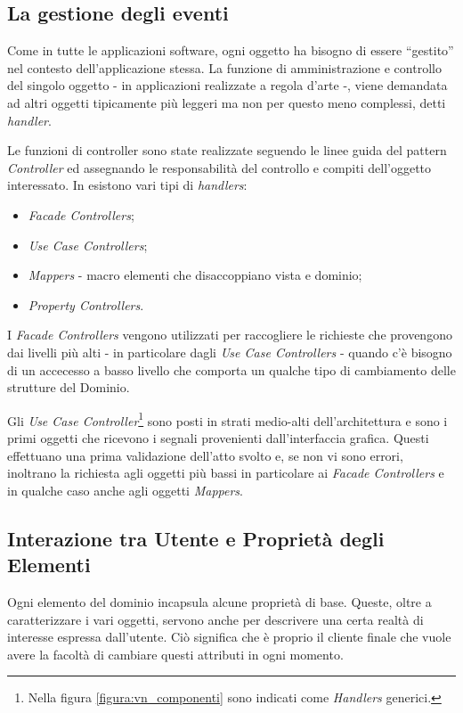 \subsection{La gestione degli eventi}
Come in tutte le applicazioni software, ogni oggetto ha bisogno di essere ``gestito'' nel contesto dell'applicazione stessa.
La funzione di amministrazione e controllo del singolo oggetto - in applicazioni realizzate a regola d'arte -, viene demandata ad altri oggetti tipicamente più leggeri ma non per questo meno complessi, detti \emph{handler}.

Le funzioni di controller sono state realizzate seguendo le linee guida del pattern \emph{Controller}\cite{AUPL04} ed assegnando le responsabilità del controllo e compiti dell'oggetto interessato. In \visualnetkit{} esistono vari tipi di \emph{handlers}:
\begin{itemize}
\item \emph{Facade Controllers};
\item \emph{Use Case Controllers};
\item \emph{Mappers} - macro elementi che disaccoppiano vista e dominio;
\item \emph{Property Controllers}.
\end{itemize}

I \emph{Facade Controllers} vengono utilizzati per raccogliere le richieste che provengono dai livelli più alti - in particolare dagli \emph{Use Case Controllers} - quando c'è bisogno di un accecesso a basso livello che comporta un qualche tipo di cambiamento delle strutture del Dominio.

Gli \emph{Use Case Controller}\footnote{Nella figura \ref{figura:vn_componenti} sono indicati come \emph{Handlers} generici.} sono posti in strati medio-alti dell'architettura e sono i primi oggetti che ricevono i segnali provenienti dall'interfaccia grafica. Questi effettuano una prima validazione dell'atto svolto e, se non vi sono errori, inoltrano la richiesta agli oggetti più bassi in particolare ai \emph{Facade Controllers} e in qualche caso anche agli oggetti \emph{Mappers}.


\subsection{Interazione tra Utente e Proprietà degli Elementi}
Ogni elemento del dominio incapsula alcune proprietà di base. Queste, oltre a caratterizzare i vari oggetti, servono anche per descrivere una certa realtà di interesse espressa dall'utente. Ciò significa che è proprio il cliente finale che vuole avere la facoltà di cambiare questi attributi in ogni momento.

